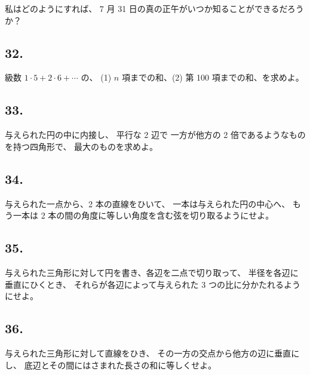 私はどのようにすれば、
7 月 31 日の真の正午がいつか知ることができるだろうか？

\begin{flushright}
[14/3/89]
\end{flushright}

\subsection*{32.}

級数 $1 \cdot 5 + 2 \cdot 6 + \cdots $ の、
(1) $n$ 項までの和、(2) 第 100 項までの和、を求めよ。

\begin{flushright}
[7/4/89]
\end{flushright}

\subsection*{33.}

与えられた円の中に内接し、
平行な 2 辺で 一方が他方の 2 倍であるようなものを持つ四角形で、
最大のものを求めよ。

\subsection*{34.}

与えられた一点から、2 本の直線をひいて、
一本は与えられた円の中心へ、
もう一本は 2 本の間の角度に等しい角度を含む弦を切り取るようにせよ。

\begin{flushright}
[21/12/74]
\end{flushright}

\subsection*{35.}

与えられた三角形に対して円を書き、各辺を二点で切り取って、
半径を各辺に垂直にひくとき、
それらが各辺によって与えられた 3 つの比に分かたれるようにせよ。

\begin{flushright}
[11/76]
\end{flushright}

\subsection*{36.}

与えられた三角形に対して直線をひき、
その一方の交点から他方の辺に垂直にし、
底辺とその間にはさまれた長さの和に等しくせよ。

